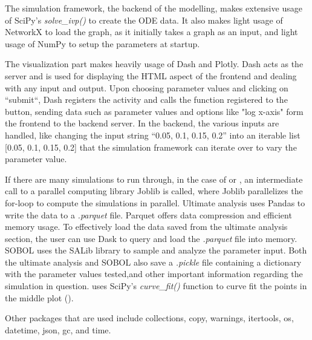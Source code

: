 The simulation framework, the backend of the modelling, makes extensive usage of SciPy's \textit{solve\_ivp()} to create the ODE data. 
It also makes light usage of NetworkX to load the graph, as it initially takes a graph as an input, and light usage of NumPy to setup the parameters at startup. 

The visualization part makes heavily usage of Dash and Plotly. 
Dash acts as the server and is used for displaying the HTML aspect of the frontend and dealing with any input and output. 
Upon choosing parameter values and clicking on “submit“, Dash registers the activity and calls the function registered to the button, sending data such as parameter values and options like "log x-axis" form the frontend to the backend server. 
In the backend, the various inputs are handled, like changing the input string “0.05, 0.1, 0.15, 0.2” into an iterable list [0.05, 0.1, 0.15, 0.2] that the simulation framework can iterate over to vary the parameter value. 

If there are many simulations to run through, in the case of  or , an intermediate call to a parallel computing library Joblib is called, where Joblib parallelizes the for-loop to compute the simulations in parallel. 
Ultimate analysis uses Pandas to write the data to a \textit{.parquet} file. 
Parquet offers data compression and efficient memory usage. 
To effectively load the data saved from the ultimate analysis section, the user can use Dask to query and load the \textit{.parquet} file into memory. \newline 
SOBOL uses the SALib library to sample and analyze the parameter input. 
Both the ultimate analysis and SOBOL also save a \textit{.pickle} file containing a dictionary with the parameter values tested,and other important information regarding the simulation in question. \newline
{} uses SciPy's \textit{curve\_fit()} function to curve fit the points in the middle plot (). 

Other packages that are used include collections, copy, warnings, itertools, os, datetime, json, gc, and time. 